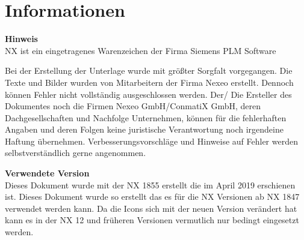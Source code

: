 \pagebreak
\section{Informationen}

\textbf{Hinweis}\\
 NX \textsuperscript{\texttrademark} ist ein eingetragenes Warenzeichen der Firma Siemens PLM Software

Bei der Erstellung der Unterlage wurde mit größter Sorgfalt vorgegangen. Die Texte und Bilder wurden von Mitarbeitern der Firma Nexeo erstellt. Dennoch können Fehler nicht vollständig ausgeschlossen werden. Der/ Die Ersteller des Dokumentes noch die Firmen Nexeo GmbH/ConmatiX GmbH, deren Dachgesellschaften und Nachfolge Unternehmen, können für die fehlerhaften Angaben und deren Folgen keine juristische Verantwortung noch irgendeine Haftung übernehmen. Verbesserungsvorschläge und Hinweise auf Fehler werden selbstverständlich gerne angenommen.

\textbf{Verwendete Version}\\
Dieses Dokument wurde mit der NX \textsuperscript{\texttrademark} 1855 erstellt die im April 2019 erschienen ist. Dieses Dokument wurde so erstellt das es für die NX Versionen ab NX\textsuperscript{\texttrademark} 1847 verwendet werden kann. Da die Icons sich mit der neuen Version verändert hat kann es in der NX\textsuperscript{\texttrademark} 12 und früheren Versionen vermutlich nur bedingt eingesetzt werden. 

